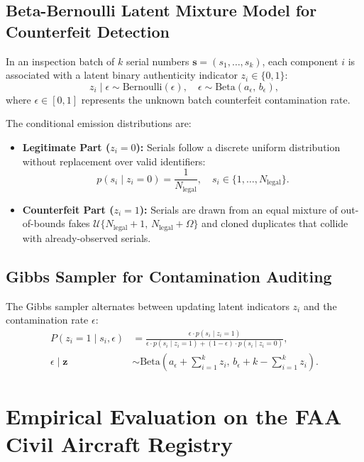 \documentclass[11pt,a4paper]{article}
\begin{document}
\subsection{Beta-Bernoulli Latent Mixture Model for Counterfeit Detection}
In an inspection batch of $k$ serial numbers $\mathbf{s} = (s_1, \dots, s_k)$, each component $i$ is associated with a latent binary authenticity indicator $z_i \in \{0, 1\}$:
\begin{equation}
z_i \mid \epsilon \sim \text{Bernoulli}(\epsilon), \quad \epsilon \sim \text{Beta}(a_\epsilon, \, b_\epsilon),
\end{equation}
where $\epsilon \in [0, 1]$ represents the unknown batch counterfeit contamination rate.

The conditional emission distributions are:
\begin{itemize}
    \item \textbf{Legitimate Part ($z_i = 0$):} Serials follow a discrete uniform distribution without replacement over valid identifiers:
    \begin{equation}
    p(s_i \mid z_i = 0) = \frac{1}{N_{\text{legal}}}, \quad s_i \in \{1, \dots, N_{\text{legal}}\}.
    \end{equation}
    \item \textbf{Counterfeit Part ($z_i = 1$):} Serials are drawn from an equal mixture of out-of-bounds fakes $\mathcal{U}\{N_{\text{legal}}+1, \, N_{\text{legal}} + \Omega\}$ and cloned duplicates that collide with already-observed serials.
\end{itemize}

\subsection{Gibbs Sampler for Contamination Auditing}
The Gibbs sampler alternates between updating latent indicators $z_i$ and the contamination rate $\epsilon$:
\begin{align}
P(z_i = 1 \mid s_i, \epsilon) &= \frac{\epsilon \cdot p(s_i \mid z_i = 1)}{\epsilon \cdot p(s_i \mid z_i = 1) + (1 - \epsilon) \cdot p(s_i \mid z_i = 0)}, \\
\epsilon \mid \mathbf{z} &\sim \text{Beta}\left( a_\epsilon + \sum_{i=1}^k z_i, \, b_\epsilon + k - \sum_{i=1}^k z_i \right).
\end{align}

\section{Empirical Evaluation on the FAA Civil Aircraft Registry}
\end{document}
